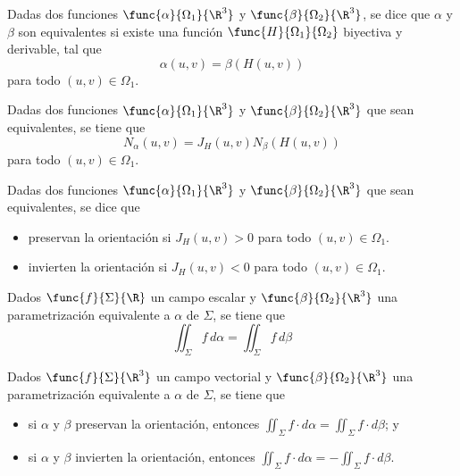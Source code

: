 \documentclass[a4,11pt]{aleph-notas}
\begin{document}

\begin{defi}
    Dadas dos funciones $\func{\alpha}{\Omega_1}{\R^3}$ y $\func{\beta}{\Omega_2}{\R^3}$, se dice que $\alpha$ y $\beta$ son equivalentes si existe una función $\func{H}{\Omega_1}{\Omega_2}$ biyectiva y derivable, tal que
    \[
        \alpha(u,v)=\beta(H(u,v))
    \]
    para todo $(u,v)\in \Omega_1$.
\end{defi}

 
\begin{prop}
    Dadas dos funciones $\func{\alpha}{\Omega_1}{\R^3}$ y $\func{\beta}{\Omega_2}{\R^3}$ que sean equivalentes, se tiene que
    \[
        N_\alpha(u,v) = J_H(u,v) N_\beta(H(u,v))
    \]
    para todo $(u,v)\in \Omega_1$.
\end{prop}

 
\begin{defi}
     Dadas dos funciones $\func{\alpha}{\Omega_1}{\R^3}$ y $\func{\beta}{\Omega_2}{\R^3}$ que sean equivalentes, se dice que
    \begin{itemize}
        \item preservan la orientación si $J_H(u,v)>0$ para todo $(u,v)\in \Omega_1$.
        \item invierten la orientación si $J_H(u,v)<0$ para todo $(u,v)\in \Omega_1$.
    \end{itemize}
\end{defi}

\begin{prop}
    Dados $\func{f}{\Sigma}{\R}$ un campo escalar y $\func{\beta}{\Omega_2}{\R^3}$ una parametrización equivalente a $\alpha$ de $\Sigma$, se tiene que
    \[
        \iint_\Sigma f \,d\alpha = \iint_\Sigma f \,d\beta
    \]
\end{prop}

\begin{prop}
    Dados $\func{f}{\Sigma}{\R^3}$ un campo vectorial y $\func{\beta}{\Omega_2}{\R^3}$ una parametrización equivalente a $\alpha$ de $\Sigma$, se tiene que
    \begin{itemize}
        \item si $\alpha$ y $\beta$ preservan la orientación, entonces $\iint_\Sigma f \cdot d\alpha = \iint_\Sigma f \cdot d\beta$; y
        \item si $\alpha$ y $\beta$ invierten la orientación, entonces $\iint_\Sigma f \cdot d\alpha = -\iint_\Sigma f \cdot d\beta$.
    \end{itemize}
\end{prop}
\end{document}
